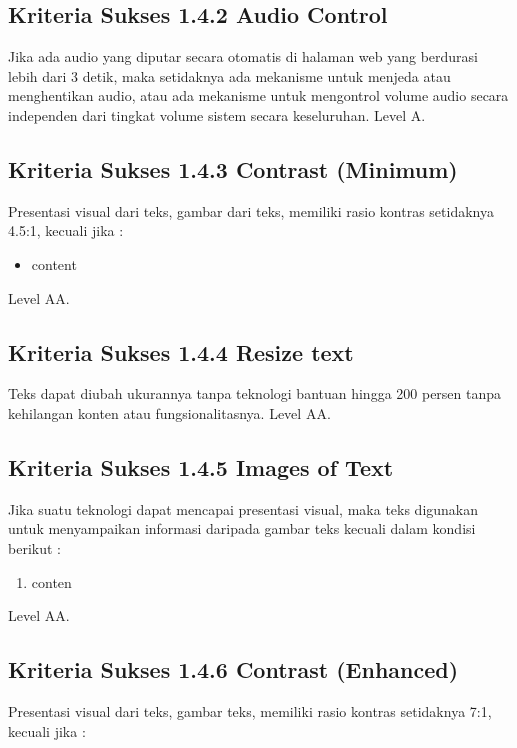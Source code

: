 \subsection{Kriteria Sukses 1.4.2 Audio Control}
\label{sec:kriteria_1.4.2}
Jika ada audio yang diputar secara otomatis di halaman web yang berdurasi lebih dari 3 detik, maka setidaknya ada mekanisme untuk menjeda atau menghentikan audio, atau ada mekanisme untuk mengontrol volume audio secara independen dari tingkat volume sistem secara keseluruhan.
Level A.

\subsection{Kriteria Sukses 1.4.3 Contrast (Minimum)}
\label{sec:kriteria_1.4.3}
Presentasi visual dari teks, gambar dari teks, memiliki rasio kontras setidaknya 4.5:1, kecuali jika :

\begin{itemize}
	\item content
\end{itemize}
Level AA.

\subsection{Kriteria Sukses 1.4.4 Resize text}
\label{sec:kriteria_1.4.4}
Teks dapat diubah ukurannya tanpa teknologi bantuan hingga 200 persen tanpa kehilangan konten atau fungsionalitasnya.
Level AA.

\subsection{Kriteria Sukses 1.4.5 Images of Text}
\label{sec:kriteria_1.4.5}
Jika suatu teknologi dapat mencapai presentasi visual, maka teks digunakan untuk menyampaikan informasi daripada gambar teks kecuali dalam kondisi berikut :

\begin{enumerate}
	\item conten
\end{enumerate}
Level AA.

\subsection{Kriteria Sukses 1.4.6 Contrast (Enhanced)}
\label{sec:kriteria_1.4.6}
Presentasi visual dari teks, gambar teks, memiliki rasio kontras setidaknya 7:1, kecuali jika :

